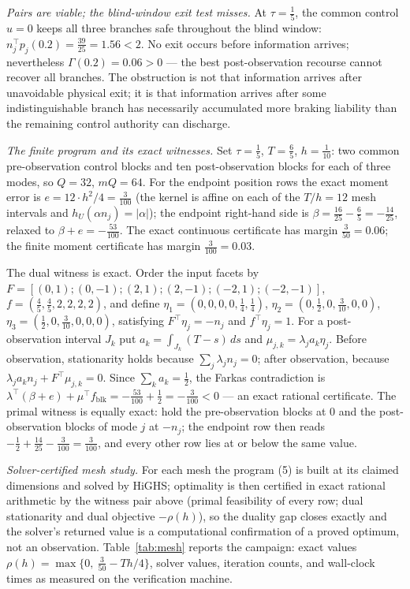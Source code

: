 \documentclass[10pt,twocolumn]{article}
\theoremstyle{plain}
\theoremstyle{definition}
\theoremstyle{remark}
\begin{document}
\emph{Pairs are viable; the blind-window exit test misses.} At
\(\tau = \tfrac15\), the common control \(u = 0\) keeps all three branches
safe throughout the blind window:
\(n_j^\top p_j(0.2) = \tfrac{39}{25} = 1.56 < 2\). No exit occurs before
information arrives; nevertheless \(\Gamma(0.2) = 0.06 > 0\) --- the best
post-observation recourse cannot recover all branches. The obstruction is
not that information arrives after unavoidable physical exit; it is that
information arrives after some indistinguishable branch has necessarily
accumulated more braking liability than the remaining control authority can
discharge.

\emph{The finite program and its exact witnesses.} Set
\(\tau = \tfrac15\), \(T = \tfrac65\), \(h = \tfrac1{10}\): two common
pre-observation control blocks and ten post-observation blocks for each of
three modes, so \(Q = 32\), \(mQ = 64\). For the endpoint position rows the
exact moment error is \(e = 12 \cdot h^2/4 = \tfrac{3}{100}\) (the kernel is
affine on each of the \(T/h = 12\) mesh intervals and
\(h_U(\alpha n_j) = |\alpha|\)); the endpoint right-hand side is
\(\beta = \tfrac{16}{25} - \tfrac65 = -\tfrac{14}{25}\), relaxed to
\(\beta + e = -\tfrac{53}{100}\). The exact continuous certificate has
margin \(\tfrac{3}{50} = 0.06\); the finite moment certificate has margin
\(\tfrac{3}{100} = 0.03\).

The dual witness is exact. Order the input facets by
\(F = [(0,1);(0,-1);(2,1);(2,-1);(-2,1);(-2,-1)]\),
\(f = (\tfrac45, \tfrac45, 2, 2, 2, 2)\), and define
\(\eta_1 = (0,0,0,0,\tfrac14,\tfrac14)\),
\(\eta_2 = (0,\tfrac12,0,\tfrac3{10},0,0)\),
\(\eta_3 = (\tfrac12,0,\tfrac3{10},0,0,0)\), satisfying
\(F^\top \eta_j = -n_j\) and \(f^\top \eta_j = 1\). For a post-observation
interval \(J_k\) put \(a_k = \int_{J_k} (T - s)\, ds\) and
\(\mu_{j,k} = \lambda_j a_k \eta_j\). Before observation, stationarity holds
because \(\sum_j \lambda_j n_j = 0\); after observation, because
\(\lambda_j a_k n_j + F^\top \mu_{j,k} = 0\). Since
\(\sum_k a_k = \tfrac12\), the Farkas contradiction is
\(\lambda^\top(\beta + e) + \mu^\top f_{\mathrm{blk}} = -\tfrac{53}{100} +
\tfrac12 = -\tfrac{3}{100} < 0\) --- an exact rational certificate. The
primal witness is equally exact: hold the pre-observation blocks at \(0\) and
the post-observation blocks of mode \(j\) at \(-n_j\); the endpoint row then
reads \(-\tfrac12 + \tfrac{14}{25} - \tfrac{3}{100} = \tfrac{3}{100}\), and
every other row lies at or below the same value.

\emph{Solver-certified mesh study.} For each mesh the program (5) is built
at its claimed dimensions and solved by HiGHS; optimality is then certified
in exact rational arithmetic by the witness pair above (primal feasibility of
every row; dual stationarity and dual objective \(-\rho(h)\)), so the duality
gap closes exactly and the solver's returned value is a computational
confirmation of a proved optimum, not an observation.
Table~\ref{tab:mesh} reports the campaign: exact values
\(\rho(h) = \max\{0,\ \tfrac{3}{50} - Th/4\}\), solver values, iteration
counts, and wall-clock times as measured on the verification machine.
\end{document}
